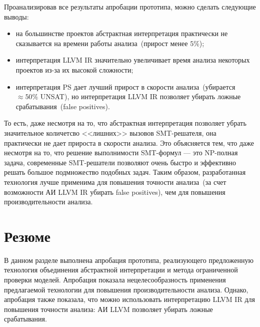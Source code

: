 Проанализировав все результаты апробации прототипа, можно сделать следующие 
выводы:
\begin{itemize}
\item на большинстве проектов абстрактная интерпретация практически не 
сказывается на времени работы анализа~(прирост менее $5\%$);
\item интерпретация LLVM IR значительно увеличивает время анализа некоторых
проектов из-за их высокой сложности;
\item интерпретация PS дает лучший прирост в скорости анализа~(убирается 
$\approx 50\%$ UNSAT), но интерпретация LLVM IR позволяет убирать ложные 
срабатывания~(false positives).
\end{itemize}

То есть, даже несмотря на то, что абстрактная интерпретация позволяет убрать
значительное количетсво <<лишних>> вызовов SMT-решателя, она практически не
дает прироста в скорости анализа. Это объясняется тем, что даже несмотря на то, 
что решение выполнимости SMT-формул --- это NP-полная задача, современные 
SMT-решатели позволяют очень быстро и эффективно решать большое подмножество
подобных задач. Таким образом, разработанная технология лучше применима для
повышения точности анализа~(за счет возможности АИ LLVM IR убирать false 
positives), чем для повышения производительности анализа.

\section{Резюме}
В данном разделе выполнена апробация прототипа, реализующего предложенную
технология объединения абстрактной интерпретации и метода ограниченной проверки
моделей. Апробация показала нецелесообразность применения предлагаемой 
технологии для повышения производительности анализа. Однако, апробация
также показала, что можно использовать интерпретацию LLVM IR для повышения
точности анализа: АИ LLVM позволяет убирать ложные срабатывания.
